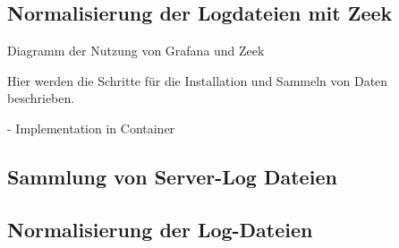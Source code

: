 \subsection{Normalisierung der Logdateien mit Zeek}
Diagramm der Nutzung von Grafana und Zeek

Hier werden die Schritte für die Installation und Sammeln von Daten beschrieben.

- Implementation in Container %


\subsection{Sammlung von Server-Log Dateien}

\subsection{Normalisierung der Log-Dateien}





